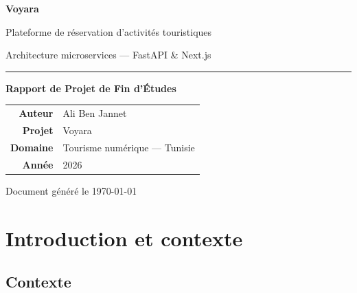 \documentclass[11pt,a4paper]{report}
\begin{document}
\begin{titlepage}
\centering
\vspace*{1.5cm}


\vspace{0.8cm}
{\Huge\bfseries\color{tbDeep} Voyara\par}
\vspace{0.4cm}
{\Large\color{tbBlue} Plateforme de réservation d'activités touristiques\par}
\vspace{0.3cm}
{\large\color{tbGrey} Architecture microservices — FastAPI \& Next.js\par}

\vspace{1.2cm}
\rule{0.55\textwidth}{1.2pt}
\vspace{1.2cm}

{\large\textbf{Rapport de Projet de Fin d'Études}\par}

\vfill

\begin{tabular}{@{}rl@{}}
\textbf{Auteur} & Ali Ben Jannet \\[4pt]
\textbf{Projet} & Voyara \\[4pt]
\textbf{Domaine} & Tourisme numérique — Tunisie \\[4pt]
\textbf{Année} & 2026 \\
\end{tabular}

\vspace{1.5cm}
{\color{tbGrey}\small Document généré le \today\par}
\end{titlepage}

\tableofcontents
\thispagestyle{empty}
\clearpage

\chapter{Introduction et contexte}

\section{Contexte}
\end{document}
